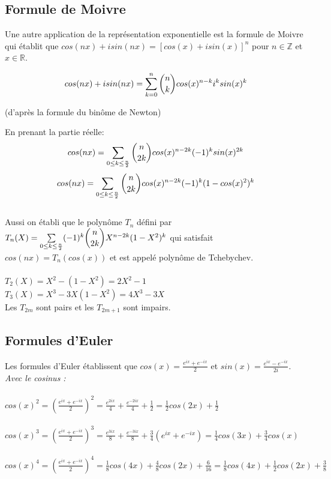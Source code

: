 \documentclass[a4paper,10pt]{book}
\newcommand{\R}{\mathbb{R}}
\newcommand{\Z}{\mathbb{Z}}
\begin{document}
\subsection{Formule de Moivre}
Une autre application de la représentation exponentielle est la formule de Moivre qui établit que
$cos(nx)+isin(nx)=[cos(x)+isin(x)]^{n}$
pour $n \in \Z$ et $x \in \R$.

\[cos(nx)+isin(nx)=\sum_{k=0}^{n} \dbinom{n}{k}cos(x)^{n-k} i^{k} sin(x)^{k}\]
\begin{center} (d'après la formule du binôme de Newton) \end{center}

En prenant la partie réelle:\\
\[cos(nx)=\sum_{0\leq k\leq \frac{n}{2}} \dbinom{n}{2k} cos(x)^{n-2k}(-1)^{k} sin(x)^{2k}\]
\[cos(nx)=\sum_{0\leq k\leq \frac{n}{2}} \dbinom{n}{2k} cos(x)^{n-2k}(-1)^{k} (1-cos(x)^{2})^{k}\]\\

Aussi on établi que le polynôme $T_{n}$ défini par $T_{n}(X)=\sum \limits_{0\leq k\leq \frac{n}{2}} (-1)^{k} \dbinom{n}{2k} X^{n-2k}(1-X^{2})^{k}$ qui satisfait $cos(nx)=T_{n}(cos(x))$ et est appelé polynôme de Tchebychev.\\\\
$T_{2}(X)=X^{2}-(1-X^{2})=2X^{2}-1$\\
$T_{3}(X)=X^{3}-3X(1-X^{2})=4X^{3}-3X$\\

Les $T_{2m}$ sont pairs et les $T_{2m+1}$ sont impairs.\\

\subsection{Formules d'Euler}
Les formules d'Euler établissent que $cos(x)=\frac{e^{ix}+e^{-ix}}{2}$ et $sin(x)=\frac{e^{ix}-e^{-ix}}{2i}$.\\

\textit{Avec le cosinus :}\\\\
$cos(x)^{2}=(\frac{e^{ix}+e^{-ix}}{2})^{2}=\frac{e^{2ix}}{4}+\frac{e^{-2ix}}{4}+\frac{1}{2}=\frac{1}{2}cos(2x)+\frac{1}{2}$\\\\
$cos(x)^{3}=(\frac{e^{ix}+e^{-ix}}{2})^{3}=\frac{e^{3ix}}{8}+\frac{e^{-3ix}}{8}+\frac{3}{4}(e^{ix}+e^{-ix})=\frac{1}{4}cos(3x)+\frac{3}{4}cos(x)$\\\\
$cos(x)^{4}=(\frac{e^{ix}+e^{-ix}}{2})^{4}=\frac{1}{8}cos(4x)+\frac{4}{8}cos(2x)+\frac{6}{16}=\frac{1}{8}cos(4x)+\frac{1}{2}cos(2x)+\frac{3}{8}$\\\\
\end{document}
